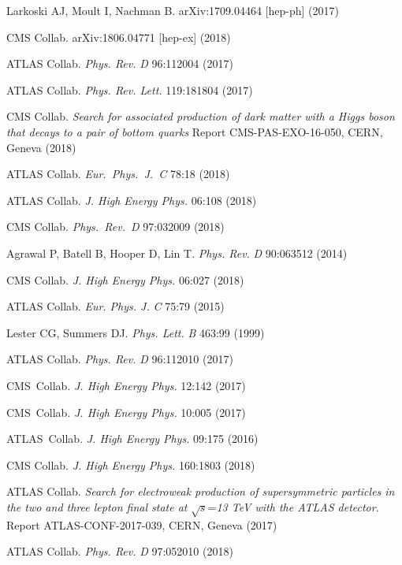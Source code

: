 \documentclass{ar-1col}
\begin{document}
\begin{thebibliography}{175}
Larkoski AJ, Moult I, Nachman B. arXiv:1709.04464 [hep-ph] (2017)

CMS Collab. arXiv:1806.04771 [hep-ex] (2018)

{ATLAS Collab.} \textit{Phys. Rev.} \textit{D} 96:112004 (2017)

{ATLAS Collab.} \textit{Phys. Rev. Lett.} 119:181804 (2017)

CMS Collab.
\textit{Search for associated production of dark matter with a Higgs boson that decays to a pair of bottom quarks}
Report CMS-PAS-EXO-16-050, CERN, Geneva (2018)

{ATLAS Collab.}  \textit{Eur.\ Phys.\ J.\ C} {78}:18 (2018)

{ATLAS Collab.} \textit{J. High Energy Phys.} 06:108 (2018)

{CMS Collab.} \textit{Phys.\ Rev.\ D} {97}:032009 (2018)

Agrawal P, Batell B, Hooper D, Lin T. \textit{Phys. Rev.}
\textit{D} 90:063512 (2014)

{CMS Collab.} \textit{J. High Energy Phys.} 06:027 (2018)

{ATLAS Collab}. \textit{Eur. Phys. J.} \textit{C} 75:79 (2015)

Lester CG, Summers DJ. \textit{Phys. Lett.} \textit{B} 463:99 (1999)

{ATLAS Collab.} \textit{Phys. Rev.} \textit{D} 96:112010 (2017)

{CMS~Collab.} \textit{J. High Energy Phys.} 12:142 (2017)

{CMS~Collab.} \textit{J. High Energy Phys.} 10:005 (2017)

{ATLAS~Collab.} \textit{J. High Energy Phys.} 09:175 (2016)

{CMS Collab.} \textit{J. High Energy Phys.} 160:1803 (2018)

ATLAS Collab. \textit{Search for electroweak production of supersymmetric particles in the two and three lepton final state at} $\sqrt{s}$=\textit{13 TeV with the ATLAS detector}.
Report ATLAS-CONF-2017-039, CERN, Geneva (2017)

{ATLAS Collab}. \textit{Phys. Rev.} \textit{D} 97:052010 (2018)


\end{thebibliography}
\end{document}
